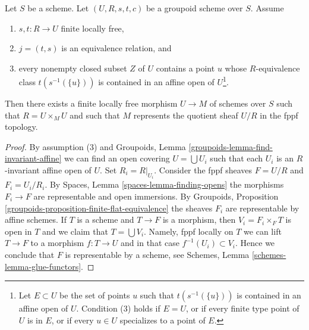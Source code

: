 \begin{proposition}
\label{proposition-finite-flat-equivalence-global}
Let $S$ be a scheme.
Let $(U, R, s, t, c)$ be a groupoid scheme over $S$.
Assume
\begin{enumerate}
\item $s, t : R \to U$ finite locally free,
\item $j = (t, s)$ is an equivalence relation, and
\item every nonempty closed subset $Z$ of $U$ contains a point
$u$ whose $R$-equivalence class $t(s^{-1}(\{u\}))$ is contained
in an affine open of $U$\footnote{Let $E \subset U$ be the
set of points $u$ such that $t(s^{-1}(\{u\}))$
is contained in an affine open of $U$. Condition (3) holds
if $E = U$, or if every finite type point of $U$ is in $E$, or
if every $u \in U$ specializes to a point of $E$.}.
\end{enumerate}
Then there exists a finite locally free morphism $U \to M$
of schemes over $S$ such that $R = U \times_M U$ and such that $M$
represents the quotient sheaf $U/R$ in the fppf topology.
\end{proposition}

\begin{proof}
By assumption (3) and
Groupoids, Lemma \ref{groupoids-lemma-find-invariant-affine}
we can find an open covering $U = \bigcup U_i$ such that each $U_i$
is an $R$-invariant affine open of $U$. Set $R_i = R|_{U_i}$.
Consider the fppf sheaves $F = U/R$ and $F_i = U_i/R_i$.
By Spaces, Lemma \ref{spaces-lemma-finding-opens} the morphisms
$F_i \to F$ are representable and open immersions.
By Groupoids, Proposition \ref{groupoids-proposition-finite-flat-equivalence}
the sheaves $F_i$ are representable by affine schemes.
If $T$ is a scheme and $T \to F$ is a morphism, then $V_i = F_i \times_F T$
is open in $T$ and we claim that $T = \bigcup V_i$. Namely,
fppf locally on $T$ we can lift $T \to F$ to a morphism
$f : T \to U$ and in that case $f^{-1}(U_i) \subset V_i$.
Hence we conclude that $F$ is representable by a scheme, see
Schemes, Lemma \ref{schemes-lemma-glue-functors}.
\end{proof}
